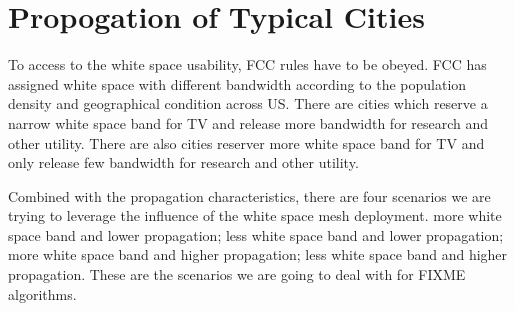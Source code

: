 \section{Propogation of Typical Cities}
\label{sec:cities}


To access to the white space usability, FCC rules have to be obeyed. 
FCC has assigned white space with different bandwidth according to the population density and geographical condition across US.
There are cities which reserve a narrow white space band for TV and release more bandwidth for research and other utility.
There are also cities reserver more white space band for TV and only release few bandwidth for research and other utility.

Combined with the propagation characteristics, there are four scenarios we are trying to leverage the influence of the white space mesh deployment.
more white space band and lower propagation; less white space band and lower propagation; more white space band and higher propagation; less white space band and higher propagation.
These are the scenarios we are going to deal with for FIXME algorithms.


